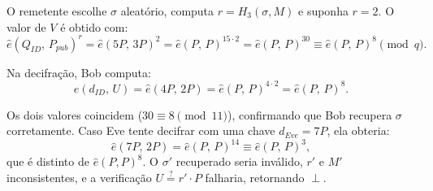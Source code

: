 O remetente escolhe $\sigma$ aleatório, computa $r = H_3(\sigma, M)$ e suponha $r = 2$. O
valor de $V$ é obtido com:
\[
  \hat{e}(Q_{\mathit{ID}},\, P_{\mathit{pub}})^r
  = \hat{e}(5P,\, 3P)^2
  = \hat{e}(P,\, P)^{15 \cdot 2}
  = \hat{e}(P,\, P)^{30}
  \equiv \hat{e}(P,\, P)^{8} \pmod{q}.
\]

Na decifração, Bob computa:
\[
  \hat{e}(d_{\mathit{ID}},\, U)
  = \hat{e}(4P,\, 2P)
  = \hat{e}(P,\, P)^{4 \cdot 2}
  = \hat{e}(P,\, P)^{8}.
\]

Os dois valores coincidem ($30 \equiv 8 \pmod{11}$), confirmando que Bob recupera $\sigma$
corretamente. Caso Eve tente decifrar com uma chave $d_{\mathit{Eve}} = 7P$, ela obteria:
\[
  \hat{e}(7P,\, 2P) = \hat{e}(P,\, P)^{14} \equiv \hat{e}(P,\, P)^{3},
\]
que é distinto de $\hat{e}(P,P)^8$. O $\sigma'$ recuperado seria inválido, $r'$ e $M'$
inconsistentes, e a verificação $U \stackrel{?}{=} r' \cdot P$ falharia, retornando $\perp$.
